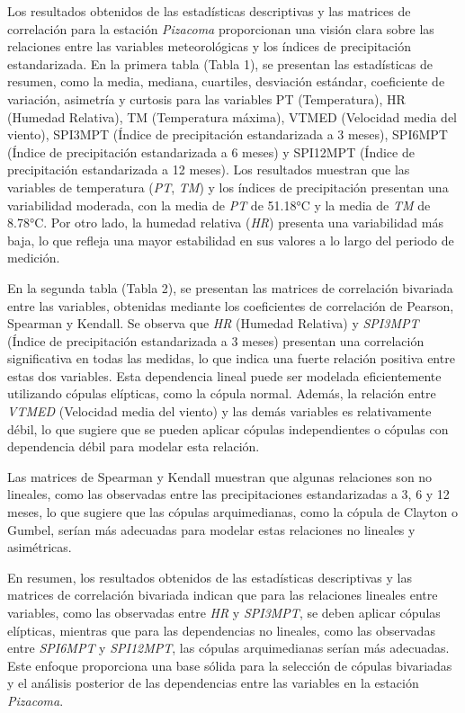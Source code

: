 \begin{figure}[htbp]
\end{figure}

Los resultados obtenidos de las estadísticas descriptivas y las matrices de correlación para la estación \textit{Pizacoma} proporcionan una visión clara sobre las relaciones entre las variables meteorológicas y los índices de precipitación estandarizada. En la primera tabla (Tabla 1), se presentan las estadísticas de resumen, como la media, mediana, cuartiles, desviación estándar, coeficiente de variación, asimetría y curtosis para las variables PT (Temperatura), HR (Humedad Relativa), TM (Temperatura máxima), VTMED (Velocidad media del viento), SPI3MPT (Índice de precipitación estandarizada a 3 meses), SPI6MPT (Índice de precipitación estandarizada a 6 meses) y SPI12MPT (Índice de precipitación estandarizada a 12 meses). Los resultados muestran que las variables de temperatura (\textit{PT}, \textit{TM}) y los índices de precipitación presentan una variabilidad moderada, con la media de \textit{PT} de 51.18°C y la media de \textit{TM} de 8.78°C. Por otro lado, la humedad relativa (\textit{HR}) presenta una variabilidad más baja, lo que refleja una mayor estabilidad en sus valores a lo largo del periodo de medición.

En la segunda tabla (Tabla 2), se presentan las matrices de correlación bivariada entre las variables, obtenidas mediante los coeficientes de correlación de Pearson, Spearman y Kendall. Se observa que \textit{HR} (Humedad Relativa) y \textit{SPI3MPT} (Índice de precipitación estandarizada a 3 meses) presentan una correlación significativa en todas las medidas, lo que indica una fuerte relación positiva entre estas dos variables. Esta dependencia lineal puede ser modelada eficientemente utilizando cópulas elípticas, como la cópula normal. Además, la relación entre \textit{VTMED} (Velocidad media del viento) y las demás variables es relativamente débil, lo que sugiere que se pueden aplicar cópulas independientes o cópulas con dependencia débil para modelar esta relación.

Las matrices de Spearman y Kendall muestran que algunas relaciones son no lineales, como las observadas entre las precipitaciones estandarizadas a 3, 6 y 12 meses, lo que sugiere que las cópulas arquimedianas, como la cópula de Clayton o Gumbel, serían más adecuadas para modelar estas relaciones no lineales y asimétricas.

En resumen, los resultados obtenidos de las estadísticas descriptivas y las matrices de correlación bivariada indican que para las relaciones lineales entre variables, como las observadas entre \textit{HR} y \textit{SPI3MPT}, se deben aplicar cópulas elípticas, mientras que para las dependencias no lineales, como las observadas entre \textit{SPI6MPT} y \textit{SPI12MPT}, las cópulas arquimedianas serían más adecuadas. Este enfoque proporciona una base sólida para la selección de cópulas bivariadas y el análisis posterior de las dependencias entre las variables en la estación \textit{Pizacoma}.


